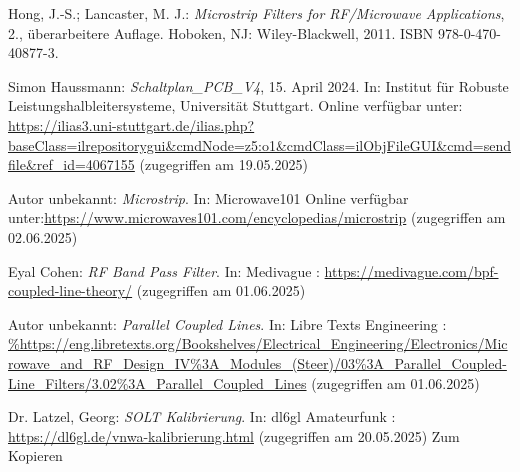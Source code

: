 
\begin{thebibliography}{1}
Hong, J.-S.; Lancaster, M. J.: \emph{Microstrip Filters for RF/Microwave Applications}, 2., überarbeitere Auflage. Hoboken, NJ: Wiley-Blackwell, 2011. ISBN 978-0-470-40877-3.

Simon Haussmann: \emph{Schaltplan\_PCB\_V4}, 15. April 2024. In: Institut für Robuste Leistungshalbleitersysteme, Universität Stuttgart. Online verfügbar unter: \url{https://ilias3.uni-stuttgart.de/ilias.php?baseClass=ilrepositorygui&cmdNode=z5:o1&cmdClass=ilObjFileGUI&cmd=sendfile&ref_id=4067155} (zugegriffen am 19.05.2025)


Autor unbekannt: \emph{Microstrip}. In: Microwave101 Online verfügbar unter:\url{https://www.microwaves101.com/encyclopedias/microstrip} (zugegriffen am 02.06.2025)


Eyal Cohen: \emph{RF Band Pass Filter}. In: Medivague : \url{https://medivague.com/bpf-coupled-line-theory/} (zugegriffen am 01.06.2025)

Autor unbekannt: \emph{Parallel Coupled Lines}. In: Libre Texts Engineering : \url{%https://eng.libretexts.org/Bookshelves/Electrical_Engineering/Electronics/Microwave_and_RF_Design_IV%3A_Modules_(Steer)/03%3A_Parallel_Coupled-Line_Filters/3.02%3A_Parallel_Coupled_Lines} (zugegriffen am 01.06.2025)


Dr.  Latzel, Georg: \emph{SOLT Kalibrierung}. In: dl6gl Amateurfunk : \url{https://dl6gl.de/vnwa-kalibrierung.html} (zugegriffen am 20.05.2025) Zum Kopieren






\end{thebibliography}

\clearpage
